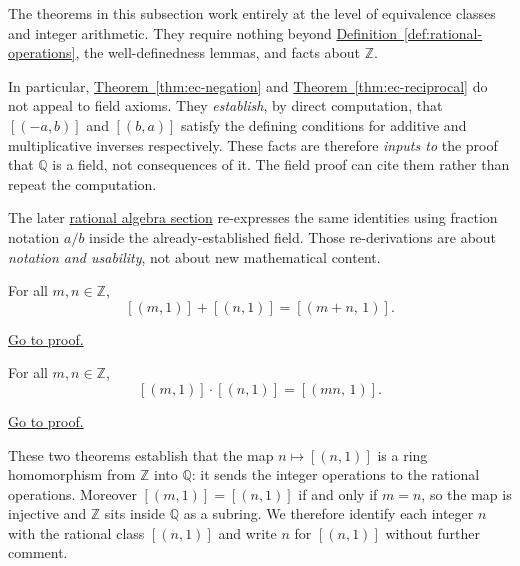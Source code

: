 \begin{remark}
\label{rem:ec-arithmetic-role}

The theorems in this subsection work entirely at the level of
equivalence classes and integer arithmetic.  They require nothing
beyond \hyperref[def:rational-operations]{Definition~\ref*{def:rational-operations}},
the well-definedness lemmas, and facts about $\mathbb{Z}$.

In particular, \hyperref[thm:ec-negation]{Theorem~\ref*{thm:ec-negation}}
and \hyperref[thm:ec-reciprocal]{Theorem~\ref*{thm:ec-reciprocal}} do
not appeal to field axioms.  They \emph{establish}, by direct
computation, that $[(-a,b)]$ and $[(b,a)]$ satisfy the defining
conditions for additive and multiplicative inverses respectively.
These facts are therefore \emph{inputs to} the proof that $\mathbb{Q}$
is a field, not consequences of it.  The field proof can cite them
rather than repeat the computation.

The later \hyperref[sec:rational-algebra]{rational algebra section}
re-expresses the same identities using fraction notation $a/b$ inside
the already-established field.  Those re-derivations are about
\emph{notation and usability}, not about new mathematical content.

\end{remark}

\begin{theorem}
\label{thm:ec-integer-embedding-add}
For all $m,n\in\mathbb{Z}$,
\[
[(m,1)] + [(n,1)] = [(m+n,\,1)].
\]
\end{theorem}

\begin{remark*}[Proof]
\hyperref[prf:ec-integer-embedding-add]{Go to proof.}
\end{remark*}

\begin{theorem}
\label{thm:ec-integer-embedding-mul}
For all $m,n\in\mathbb{Z}$,
\[
[(m,1)] \cdot [(n,1)] = [(mn,\,1)].
\]
\end{theorem}

\begin{remark*}[Proof]
\hyperref[prf:ec-integer-embedding-mul]{Go to proof.}
\end{remark*}

\begin{remark}
\label{rem:integer-embedding}
These two theorems establish that the map $n\mapsto[(n,1)]$ is a ring
homomorphism from $\mathbb{Z}$ into $\mathbb{Q}$: it sends the integer
operations to the rational operations.  Moreover $[(m,1)]=[(n,1)]$ if
and only if $m=n$, so the map is injective and $\mathbb{Z}$ sits inside
$\mathbb{Q}$ as a subring.  We therefore identify each integer $n$ with
the rational class $[(n,1)]$ and write $n$ for $[(n,1)]$ without further
comment.
\end{remark}

